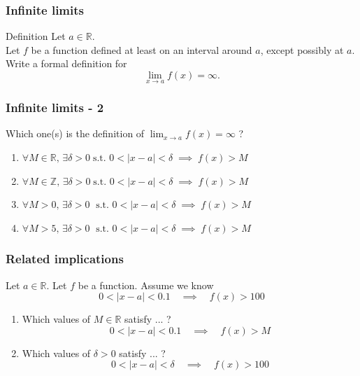 \begin{frame}
	\frametitle{Infinite limits}

	\begin{block}{Definition}
		Let $a \in \mathbb{R}$. \\ Let $f$ be a function defined at least on an
		interval around $a$, except possibly at $a$. \\ Write a formal definition
		for
		\[
			\lim_{x \to a}f(x) = \infty.
		\]
	\end{block}
\end{frame}

\begin{frame}[t]
	\frametitle{Infinite limits - 2}

	Which one(s) is the definition of $\displaystyle \lim_{x \to a}f(x) = \infty$ ?
	\vfill
	\begin{enumerate}
		\item $\displaystyle \forall M \in \mathbb{R}, \, \exists \delta > 0 \; \text{
			s.t. }0 < |x-a|<\delta \; \implies \; f(x) > M$
			\vfill

		\item $\displaystyle \forall M \in \mathbb{Z}, \, \exists \delta > 0 \; \text{
			s.t. }0 < |x-a|<\delta \; \implies \; f(x) > M$
			\vfill

		\item $\displaystyle \forall M > 0, \, \exists \delta > 0 \; \text{ s.t. }0 <
			|x-a|<\delta \; \implies \; f(x) > M$
			\vfill

		\item $\displaystyle \forall M > 5, \, \exists \delta > 0 \; \text{ s.t. }0 <
			|x-a|<\delta \; \implies \; f(x) > M$
			\vfill

	\end{enumerate}
\end{frame}

\begin{frame}[t]
	\frametitle{Related implications}

	Let $a \in \mathbb{R}$. Let $f$ be a function. Assume we know
	\[
		0 < |x-a| < 0.1 \quad \implies \quad f(x) > 100
	\]
	\vspace{-.5cm}
	\begin{enumerate}
		\item Which values of $M \in \mathbb{R}$ satisfy ... ?
			\[
				0 < |x-a| < 0.1 \quad \implies \quad f(x) > M
			\]
			\vspace{-.5cm}

		\item Which values of $\delta>0$ satisfy ... ?
			\[
				0 < |x-a| < \delta \quad \implies \quad f(x) > 100
			\]
	\end{enumerate}
\end{frame}

